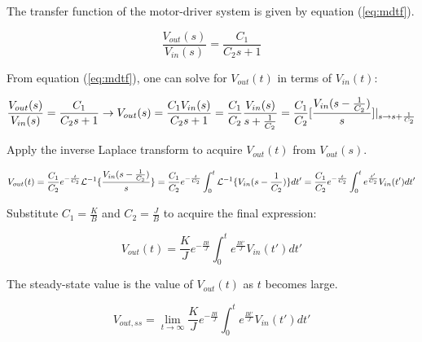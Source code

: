 The transfer function of the motor-driver system is given by equation (\ref{eq:mdtf}).

\begin{equation}
	\label{eq:mdtf}
	\frac{ V_{out}(s) }{ V_{in}(s) } = \frac{ C_1 }{ C_2 s + 1 }
\end{equation}

From equation (\ref{eq:mdtf}), one can solve for $V_{out}(t)$ in terms of $V_{in}(t)$:


\begin{equation}
	\label{eq:solve_for_vout_part1}
	\frac{ V_{out}(s) }{ V_{in}(s) } = \frac{ C_1 }{ C_2 s + 1 }
	\rightarrow V_{out}(s) = \frac{ C_1 V_{in}(s) }{ C_2 s + 1 } \\
	= \frac{ C_1 }{ C_2 } \frac{ V_{in}(s) }{ s + \frac{ 1 }{ C_2 } } \\
	= \frac{ C_1 }{ C_2 } [\frac{ V_{in}( s - \frac{ 1 }{ C_2 } ) }{ s }]|_{ s \rightarrow s + \frac{ 1 }{ C_2 } }
\end{equation}

Apply the inverse Laplace transform to acquire $V_{out}(t)$ from $V_{out}(s)$.

\begin{equation}
	\label{eq:solve_for_vout_part2}
	V_{out}(t) = \frac{ C_1 }{ C_2 } e^{ -\frac{ t }{ C_2 } } \mathcal{ L }^{ -1 } \{ \frac{ V_{in}( s - \frac{ 1 }{ C_2 } ) }{ s } \} \\
	= \frac{ C_1 }{ C_2 } e^{ -\frac{ t }{ C_2 } } \int_{0}^{t} \mathcal{ L }^{ -1 } \{ V_{in}( s - \frac{ 1 }{ C_2 } ) \} dt' \\
	= \frac{ C_1 }{ C_2 } e^{ -\frac{ t }{ C_2 } } \int_{0}^{t} e^{ \frac{ t' }{ C_2 } } V_{in}( t' )dt'
\end{equation}

Substitute $C_1 = \frac{K}{B}$ and $C_2 = \frac{J}{B}$ to acquire the final expression:

\begin{equation}
	\label{eq:final_vout}
	V_{out}(t) = \frac{K}{J} e^{ -\frac{Bt}{J} } \int_{0}^{t} e^{ \frac{Bt'}{J} } V_{in}(t') dt'
\end{equation}


The steady-state value is the value of $V_{out}(t)$ as $t$ becomes large.

\begin{equation}
	\label{eq:steady_state_gen}
	V_{out,ss} = \lim_{t\to\infty} \frac{K}{J} e^{ -\frac{Bt}{J} } \int_{0}^{t} e^{ \frac{Bt'}{J} } V_{in}(t') dt'
\end{equation}

